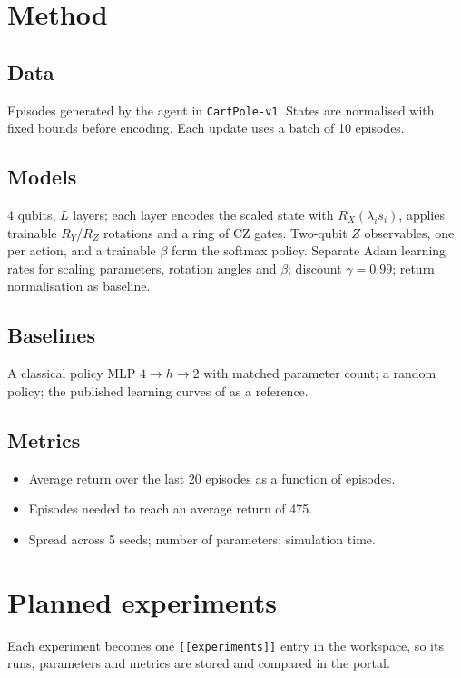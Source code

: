 \documentclass[11pt,a4paper]{article}
\begin{document}
\section{Method}
\subsection{Data}
Episodes generated by the agent in \texttt{CartPole-v1}. States are normalised with fixed bounds
before encoding. Each update uses a batch of 10 episodes.

\subsection{Models}
4 qubits, $L$ layers; each layer encodes the scaled state with $R_X(\lambda_is_i)$, applies trainable
$R_Y$/$R_Z$ rotations and a ring of CZ gates. Two-qubit $Z$ observables, one per action, and a
trainable $\beta$ form the softmax policy. Separate Adam learning rates for scaling parameters,
rotation angles and $\beta$; discount $\gamma=0.99$; return normalisation as baseline.

\subsection{Baselines}
A classical policy MLP $4\to h\to2$ with matched parameter count; a random policy; the published
learning curves of \citet{jerbi2021} as a reference.

\subsection{Metrics}
\begin{itemize}
  \item Average return over the last 20 episodes as a function of episodes.
  \item Episodes needed to reach an average return of 475.
  \item Spread across 5 seeds; number of parameters; simulation time.
\end{itemize}

\section{Planned experiments}
Each experiment becomes one \texttt{[[experiments]]} entry in the workspace, so its runs, parameters
and metrics are stored and compared in the portal.
\end{document}
